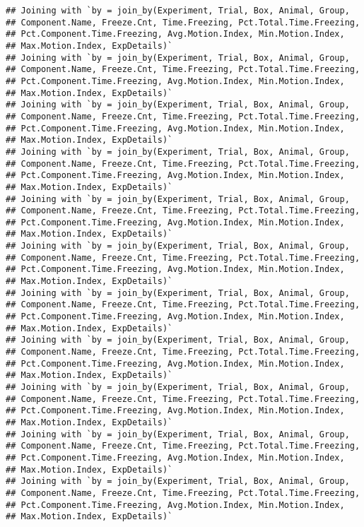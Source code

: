 \documentclass[
]{article}
\begin{document}
\begin{verbatim}
## Joining with `by = join_by(Experiment, Trial, Box, Animal, Group,
## Component.Name, Freeze.Cnt, Time.Freezing, Pct.Total.Time.Freezing,
## Pct.Component.Time.Freezing, Avg.Motion.Index, Min.Motion.Index,
## Max.Motion.Index, ExpDetails)`
## Joining with `by = join_by(Experiment, Trial, Box, Animal, Group,
## Component.Name, Freeze.Cnt, Time.Freezing, Pct.Total.Time.Freezing,
## Pct.Component.Time.Freezing, Avg.Motion.Index, Min.Motion.Index,
## Max.Motion.Index, ExpDetails)`
## Joining with `by = join_by(Experiment, Trial, Box, Animal, Group,
## Component.Name, Freeze.Cnt, Time.Freezing, Pct.Total.Time.Freezing,
## Pct.Component.Time.Freezing, Avg.Motion.Index, Min.Motion.Index,
## Max.Motion.Index, ExpDetails)`
## Joining with `by = join_by(Experiment, Trial, Box, Animal, Group,
## Component.Name, Freeze.Cnt, Time.Freezing, Pct.Total.Time.Freezing,
## Pct.Component.Time.Freezing, Avg.Motion.Index, Min.Motion.Index,
## Max.Motion.Index, ExpDetails)`
## Joining with `by = join_by(Experiment, Trial, Box, Animal, Group,
## Component.Name, Freeze.Cnt, Time.Freezing, Pct.Total.Time.Freezing,
## Pct.Component.Time.Freezing, Avg.Motion.Index, Min.Motion.Index,
## Max.Motion.Index, ExpDetails)`
## Joining with `by = join_by(Experiment, Trial, Box, Animal, Group,
## Component.Name, Freeze.Cnt, Time.Freezing, Pct.Total.Time.Freezing,
## Pct.Component.Time.Freezing, Avg.Motion.Index, Min.Motion.Index,
## Max.Motion.Index, ExpDetails)`
## Joining with `by = join_by(Experiment, Trial, Box, Animal, Group,
## Component.Name, Freeze.Cnt, Time.Freezing, Pct.Total.Time.Freezing,
## Pct.Component.Time.Freezing, Avg.Motion.Index, Min.Motion.Index,
## Max.Motion.Index, ExpDetails)`
## Joining with `by = join_by(Experiment, Trial, Box, Animal, Group,
## Component.Name, Freeze.Cnt, Time.Freezing, Pct.Total.Time.Freezing,
## Pct.Component.Time.Freezing, Avg.Motion.Index, Min.Motion.Index,
## Max.Motion.Index, ExpDetails)`
## Joining with `by = join_by(Experiment, Trial, Box, Animal, Group,
## Component.Name, Freeze.Cnt, Time.Freezing, Pct.Total.Time.Freezing,
## Pct.Component.Time.Freezing, Avg.Motion.Index, Min.Motion.Index,
## Max.Motion.Index, ExpDetails)`
## Joining with `by = join_by(Experiment, Trial, Box, Animal, Group,
## Component.Name, Freeze.Cnt, Time.Freezing, Pct.Total.Time.Freezing,
## Pct.Component.Time.Freezing, Avg.Motion.Index, Min.Motion.Index,
## Max.Motion.Index, ExpDetails)`
## Joining with `by = join_by(Experiment, Trial, Box, Animal, Group,
## Component.Name, Freeze.Cnt, Time.Freezing, Pct.Total.Time.Freezing,
## Pct.Component.Time.Freezing, Avg.Motion.Index, Min.Motion.Index,
## Max.Motion.Index, ExpDetails)`
\end{verbatim}
\end{document}
